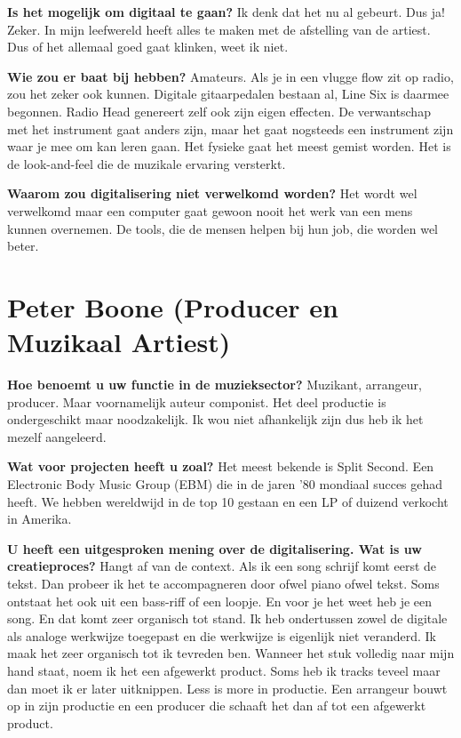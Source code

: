 \textbf{Is het mogelijk om digitaal te gaan?}\newline
Ik denk dat het nu al gebeurt. Dus ja! Zeker. In mijn leefwereld heeft alles te maken met de afstelling van de artiest. Dus of het allemaal goed gaat klinken, weet ik niet.

\textbf{Wie zou er baat bij hebben?}\newline
Amateurs. Als je in een vlugge flow zit op radio, zou het zeker ook kunnen. Digitale gitaarpedalen bestaan al, Line Six is daarmee begonnen. Radio Head genereert zelf ook zijn eigen effecten.
De verwantschap met het instrument gaat anders zijn, maar het gaat nogsteeds een instrument zijn waar je mee om kan leren gaan.
Het fysieke gaat het meest gemist worden. Het is de look-and-feel die de muzikale ervaring versterkt.

\textbf{Waarom zou digitalisering niet verwelkomd worden?}\newline
Het wordt wel verwelkomd maar een computer gaat gewoon nooit het werk van een mens kunnen overnemen.
De tools, die de mensen helpen bij hun job, die worden wel beter.

\section{Peter Boone (Producer en Muzikaal Artiest)}
\label{trans:peterboone}

\textbf{Hoe benoemt u uw functie in de muzieksector?}\newline
Muzikant, arrangeur, producer. Maar voornamelijk auteur componist. Het deel productie is ondergeschikt maar noodzakelijk. Ik wou niet afhankelijk zijn dus heb ik het mezelf aangeleerd.

\textbf{Wat voor projecten heeft u zoal?}\newline
Het meest bekende is Split Second. Een Electronic Body Music Group (EBM) die in de jaren '80 mondiaal succes gehad heeft. We hebben wereldwijd in de top 10 gestaan en een LP of duizend verkocht in Amerika.

\textbf{U heeft een uitgesproken mening over de digitalisering. Wat is uw creatieproces?}\newline
Hangt af van de context. Als ik een song schrijf komt eerst de tekst.
Dan probeer ik het te accompagneren door ofwel piano ofwel tekst. Soms ontstaat het ook uit een bass-riff of een loopje.
En voor je het weet heb je een song. En dat komt zeer organisch tot stand.
Ik heb ondertussen zowel de digitale als analoge werkwijze toegepast en die werkwijze is eigenlijk niet veranderd.
Ik maak het zeer organisch tot ik tevreden ben. Wanneer het stuk volledig naar mijn hand staat, noem ik het een afgewerkt product.
Soms heb ik tracks teveel maar dan moet ik er later uitknippen. Less is more in productie.
Een arrangeur bouwt op in zijn productie en een producer die schaaft het dan af tot een afgewerkt product.

